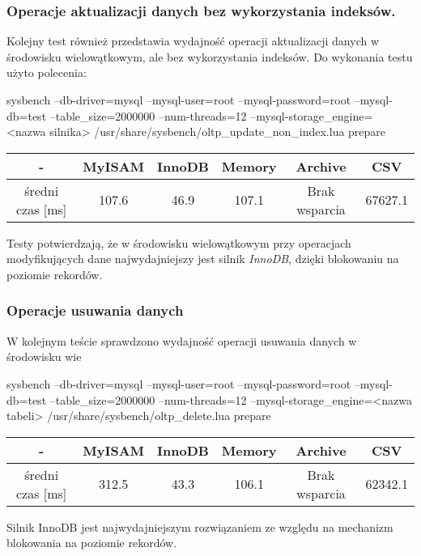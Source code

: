 \subsubsection{Operacje aktualizacji danych bez wykorzystania indeksów.}
Kolejny test również przedstawia wydajność operacji aktualizacji danych w środowisku wielowątkowym, ale bez wykorzystania indeksów.
Do wykonania testu użyto polecenia:
\begin{spverbatim}
	sysbench --db-driver=mysql --mysql-user=root --mysql-password=root --mysql-db=test --table_size=2000000 --num-threads=12 --mysql-storage_engine=
	<nazwa silnika> /usr/share/sysbench/oltp_update_non_index.lua prepare
	
\end{spverbatim}
\begin{center}
	\begin{tabular}{ | c | c | c | c | c | c |}
		\hline
		- & MyISAM & InnoDB & Memory & Archive & CSV  \\ 
		\hline
		średni czas [ms] & 107.6 & 46.9 & 107.1 & Brak wsparcia & 67627.1 \\
		\hline
	\end{tabular}
\end{center}

Testy potwierdzają, że w środowisku wielowątkowym przy operacjach modyfikujących dane najwydajniejszy jest silnik \textit{InnoDB}, dzięki blokowaniu na poziomie rekordów.
\subsubsection{Operacje usuwania danych}
W kolejnym teście sprawdzono wydajność operacji usuwania danych w środowisku wie
\begin{spverbatim}
	sysbench --db-driver=mysql --mysql-user=root --mysql-password=root --mysql-db=test --table_size=2000000 --num-threads=12 --mysql-storage_engine=<nazwa tabeli>  /usr/share/sysbench/oltp_delete.lua prepare
\end{spverbatim}

\begin{center}
\begin{tabular}{ | c | c | c | c | c | c |}
	\hline
	- & MyISAM & InnoDB & Memory & Archive & CSV  \\ 
	\hline
	średni czas [ms] & 312.5 & 43.3 & 106.1 & Brak wsparcia & 62342.1 \\
	\hline
\end{tabular}

Silnik InnoDB jest najwydajniejszym rozwiązaniem ze względu na mechanizm blokowania na poziomie rekordów.
\end{center}



